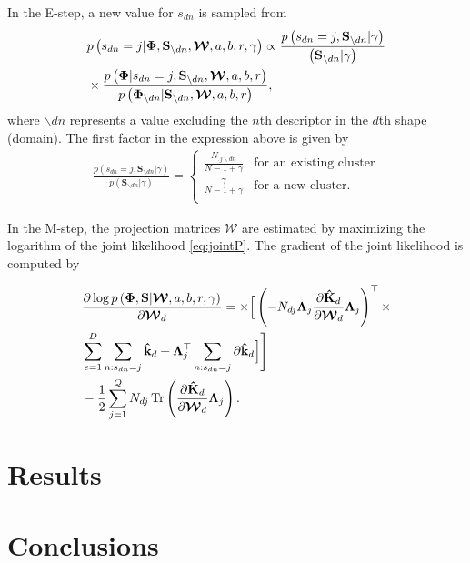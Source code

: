 \documentclass[twoside]{article}
\newcommand{\dWj}{\partial\projMat}
\newcommand{\C}{\boldsymbol{\Lambda}_j}
\newcommand{\W}{\boldsymbol{\mathcal{W}}}
\newcommand{\projMat}{\boldsymbol{\mathcal{W}}_d}
\newcommand{\kawx}{\mathbf{\hat{k}}_d }
\begin{document}
In the E-step, a new value for $s_{dn}$ is sampled from 
\begin{align}
&p\left(s_{dn}=j|\boldsymbol{\Phi},\mathbf{S}_{\backslash dn},\W,a,b,r,\gamma\right) \propto \frac{p\left(s_{dn}=j,\mathbf{S}_{\backslash dn}|\gamma\right)}{\left(\mathbf{S}_{\backslash dn}|\gamma\right)}\\ \notag
&\times\frac{p\left(\boldsymbol{\Phi}|s_{dn}=j,\mathbf{S}_{\backslash dn},\W,a,b,r\right)}{p\left(\boldsymbol{\Phi}_{\backslash dn}|\mathbf{S}_{\backslash dn},\W,a,b,r\right)},
\end{align}
where $\backslash dn$ represents a value excluding the $n$th
descriptor in the $d$th shape (domain). The first factor in the expression above is
given by
\begin{align}
\frac{p\left(s_{dn}=j,\mathbf{S}_{\backslash dn}|\gamma\right)}{p\left(\mathbf{S}_{\backslash dn}|\gamma\right)}=\left\{ {\begin{array}{*{20}{c}}
   {\frac{N_{.j\backslash dn}}{N-1+\gamma}} & {\text{for an existing cluster}}  \\
   {\frac{\gamma}{N-1+\gamma}} & {\text{for a new cluster}}.  \\
\end{array}} \right.
\end{align}

In the M-step, the projection matrices $\W$ are estimated by maximizing the logarithm of the joint likelihood \eqref{eq:jointP}. The gradient of the joint likelihood is computed by

\begin{align}
&\frac{\partial \log p\left(\boldsymbol{\Phi},\mathbf{S}|\W,a,b,r,\gamma\right)}{\partial\projMat} = \times\Big[\left(-N_{dj}\C\frac{ \partial \mathbf{\hat{K}}_d}{\dWj} \C\right)^\top \times \notag\\
& \sum\limits_{e=1}^{D}\sum\limits_{n:s_{dn}=j} \kawx +\C^\top \sum\limits_{n:s_{dn}=j} \partial\kawx\Big]
\Bigg] \notag\\
& -\frac{1}{2}\sum_{j=1}^{Q}N_{dj} \operatorname{Tr}\left(\frac{ \partial \mathbf{\hat{K}}_d}{\dWj} \C\right).
\end{align}

\section{Results}\label{sec:res}

\section{Conclusions}\label{sec:con}
\end{document}
